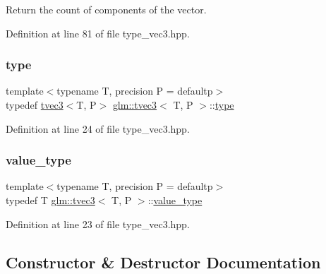 Return the count of components of the vector. 



Definition at line 81 of file type\+\_\+vec3.\+hpp.

\mbox{\label{structglm_1_1tvec3_ac2fe9ecb34ed8919d08879311ec74b8a}} 
\subsubsection{\texorpdfstring{type}{type}}
{\footnotesize\ttfamily template$<$typename T, precision P = defaultp$>$ \\
typedef \mbox{\hyperlink{structglm_1_1tvec3}{tvec3}}$<$T, P$>$ \mbox{\hyperlink{structglm_1_1tvec3}{glm\+::tvec3}}$<$ T, P $>$\+::\mbox{\hyperlink{structglm_1_1tvec3_ac2fe9ecb34ed8919d08879311ec74b8a}{type}}}



Definition at line 24 of file type\+\_\+vec3.\+hpp.

\mbox{\label{structglm_1_1tvec3_a9831435e7980f26529de581ad8fed6f0}} 
\subsubsection{\texorpdfstring{value\_type}{value\_type}}
{\footnotesize\ttfamily template$<$typename T, precision P = defaultp$>$ \\
typedef T \mbox{\hyperlink{structglm_1_1tvec3}{glm\+::tvec3}}$<$ T, P $>$\+::\mbox{\hyperlink{structglm_1_1tvec3_a9831435e7980f26529de581ad8fed6f0}{value\+\_\+type}}}



Definition at line 23 of file type\+\_\+vec3.\+hpp.



\subsection{Constructor \& Destructor Documentation}
\mbox{\label{structglm_1_1tvec3_a7bdd4b18d0b1f0c4dd84e36949793a11}} 

